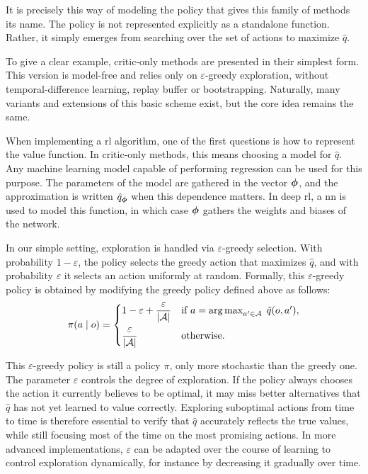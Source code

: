 It is precisely this way of modeling the policy that gives this family of methods its name.
The policy is not represented explicitly as a standalone function.
Rather, it simply emerges from searching over the set of actions to maximize \(\hat{q}\).

To give a clear example, critic-only methods are presented in their simplest form.
This version is model-free and relies only on \(\varepsilon\)-greedy exploration, without temporal-difference learning, replay buffer or bootstrapping.
Naturally, many variants and extensions of this basic scheme exist, but the core idea remains the same.

When implementing a \gls{rl} algorithm, one of the first questions is how to represent the value function.
In critic-only methods, this means choosing a model for \(\hat{q}\).
Any machine learning model capable of performing regression can be used for this purpose.
The parameters of the model are gathered in the vector \(\boldsymbol{\phi}\), and the approximation is written \(\hat{q}_{\boldsymbol{\phi}}\) when this dependence matters.
In deep \gls{rl}, a \gls{nn} is used to model this function, in which case \(\boldsymbol{\phi}\) gathers the weights and biases of the network.

In our simple setting, exploration is handled via \(\varepsilon\)-greedy selection.
With probability \(1 - \varepsilon\), the policy selects the greedy action that maximizes \(\hat{q}\), and with probability \(\varepsilon\) it selects an action uniformly at random.
Formally, this \(\varepsilon\)-greedy policy is obtained by modifying the greedy policy defined above as follows:
\begin{equation}
    \pi(a \mid o) =
    \begin{cases}
    1 - \varepsilon + \dfrac{\varepsilon}{|\mathcal{A}|} & \text{if } a = \operatorname*{arg\,max}_{a' \in \mathcal{A}}\; \hat{q}(o, a'), \\[10pt]
    \dfrac{\varepsilon}{|\mathcal{A}|} & \text{otherwise}.
    \end{cases}
    \label{eq:epsilon_greedy_policy}
\end{equation}

This \(\varepsilon\)-greedy policy is still a policy \(\pi\), only more stochastic than the greedy one.
The parameter \(\varepsilon\) controls the degree of exploration.
If the policy always chooses the action it currently believes to be optimal, it may miss better alternatives that \(\hat{q}\) has not yet learned to value correctly.
Exploring suboptimal actions from time to time is therefore essential to verify that \(\hat{q}\) accurately reflects the true values, while still focusing most of the time on the most promising actions.
In more advanced implementations, \(\varepsilon\) can be adapted over the course of learning to control exploration dynamically, for instance by decreasing it gradually over time.

